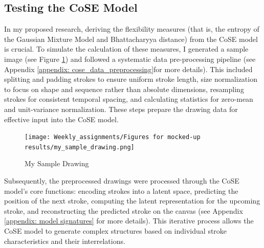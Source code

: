 \documentclass[../Proposal.tex]{subfiles}
\begin{document}

\subsection*{Testing the CoSE Model}
In my proposed research, deriving the flexibility measures (that is, the entropy of the Gaussian Mixture Model and Bhattacharyya distance) from the CoSE model is crucial. To simulate the calculation of these measures, I generated a sample image (see Figure \ref{fig: My Sample Drawing}) and followed a systematic data pre-processing pipeline (see Appendix \ref{appendix: cose_data_preprocessing}for more details). This included splitting and padding strokes to ensure uniform stroke length, size normalization to focus on shape and sequence rather than absolute dimensions, resampling strokes for consistent temporal spacing, and calculating statistics for zero-mean and unit-variance normalization. These steps prepare the drawing data for effective input into the CoSE model. 

\begin{figure}[ht]
    \centering
    \texttt{[image: Weekly\_assignments/Figures for mocked-up results/my\_sample\_drawing.png]}
    \caption{My Sample Drawing}
    \label{fig: My Sample Drawing}
\end{figure}

Subsequently, the preprocessed drawings were processed through the CoSE model's core functions: encoding strokes into a latent space, predicting the position of the next stroke, computing the latent representation for the upcoming stroke, and reconstructing the predicted stroke on the canvas (see Appendix \ref{appendix: model signatures} for more details). This iterative process allows the CoSE model to generate complex structures based on individual stroke characteristics and their interrelations. 
\end{document}
